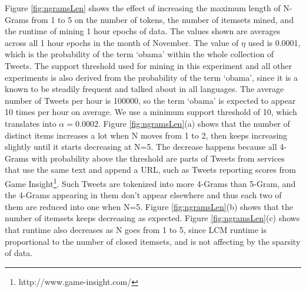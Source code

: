 \documentclass{sig-alternate}
\begin{document}
Figure \ref{fig:ngramsLen} shows the effect of increasing the maximum length of N-Grams from 1 to 5 on the number of tokens, the number of itemsets mined, and the runtime of mining 1 hour epochs of data. The values shown are averages across all 1 hour epochs in the month of November. The value of $\eta$ used is 0.0001, which is the probability of the term `obama' within the whole collection of Tweets. The support threshold used for mining in this experiment and all other experiments is also derived from the probability of the term `obama', since it is a known to be steadily frequent and talked about in all languages. The average number of Tweets per hour is 100000, so the term `obama' is expected to appear 10 times per hour on average. We use a minimum support threshold of 10, which translates into $\alpha = 0.0002$. Figure \ref{fig:ngramsLen}(a) shows that the number of distinct items increases a lot when N moves from 1 to 2, then keeps increasing slightly until it starts decreasing at N=5. The decrease happens because all 4-Grams with probability above the threshold are parts of Tweets from services that use the same text and append a URL, such as Tweets reporting scores from Game Insight\footnote{http://www.game-insight.com/}. Such Tweets are tokenized into more 4-Grams than 5-Gram, and the 4-Grams appearing in them don't appear elsewhere and thus each two of them are reduced into one when N=5.  Figure \ref{fig:ngramsLen}(b) shows that the number of itemsets keeps decreasing as expected.  Figure \ref{fig:ngramsLen}(c) shows that runtime also decreases as N goes from 1 to 5, since LCM runtime is proportional to the number of closed itemsets, and is not affecting by the sparsity of data. 
\end{document}
